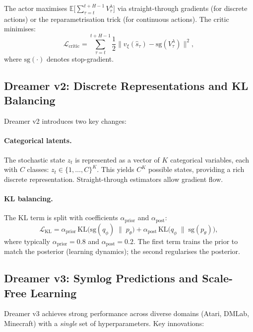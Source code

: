 \documentclass[11pt,a4paper]{article}
\theoremstyle{definition}
\newcommand{\E}{\mathbb{E}}
\newcommand{\KL}{\mathrm{KL}}
\begin{document}
The actor maximises $\E\!\big[\sum_{\tau=t}^{t+H-1} V_\tau^\lambda\big]$
via straight-through gradients (for discrete actions) or the
reparametrisation trick (for continuous actions). The critic minimises:
\begin{equation}
  \mathcal{L}_{\text{critic}} = \sum_{\tau=t}^{t+H-1}
    \frac{1}{2}\big\| v_\xi(\hat{s}_\tau) - \mathrm{sg}(V_\tau^\lambda) \big\|^2,
\end{equation}
where $\mathrm{sg}(\cdot)$ denotes stop-gradient.

\subsection{Dreamer v2: Discrete Representations and KL Balancing}

Dreamer v2 \cite{hafner2021mastering} introduces two key changes:

\paragraph{Categorical latents.} The stochastic state $z_t$ is
represented as a vector of $K$ categorical variables, each with $C$
classes: $z_t \in \{1,\ldots,C\}^K$. This yields $C^K$ possible states,
providing a rich discrete representation. Straight-through estimators
allow gradient flow.

\paragraph{KL balancing.} The KL term is split with coefficients
$\alpha_{\text{prior}}$ and $\alpha_{\text{post}}$:
\begin{equation}\label{eq:kl_balance}
  \mathcal{L}_{\KL}
  = \alpha_{\text{prior}}\,
    \KL\!\big(\mathrm{sg}(q_\phi)\;\|\; p_\theta\big)
  + \alpha_{\text{post}}\,
    \KL\!\big(q_\phi \;\|\; \mathrm{sg}(p_\theta)\big),
\end{equation}
where typically $\alpha_{\text{prior}} = 0.8$ and
$\alpha_{\text{post}} = 0.2$. The first term trains the prior to match
the posterior (learning dynamics); the second regularises the posterior.

\subsection{Dreamer v3: Symlog Predictions and Scale-Free Learning}
\label{sec:dreamer_v3}

Dreamer v3 \cite{hafner2023mastering} achieves strong performance
across diverse domains (Atari, DMLab, Minecraft) with a \emph{single}
set of hyperparameters. Key innovations:
\end{document}
